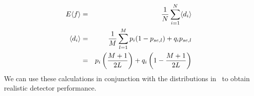 \begin{eqnarray}
  E\langle f\rangle &=& {1\over N}\sum_{i=1}^N\langle d_i \rangle\nonumber\\
  \langle d_i \rangle&=& {1\over M}\sum_{l=1}^M p_i(1-p_{se,l})+q_ip_{se,l}\nonumber\\
  &=& p_i\left( {M+1 \over 2L}\right)+q_i\left(1- {M+1 \over 2L}\right)\label{eqn:heterog_detector_mean}
\end{eqnarray}
We can use these calculations in conjunction with the distributions in~\cite{timing-error} to obtain realistic detector performance.



